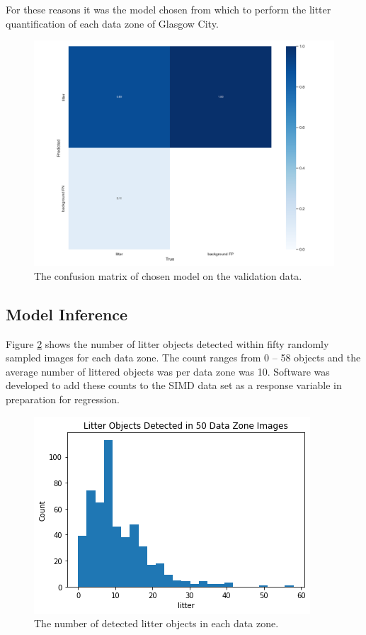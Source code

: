 \documentclass{thesis}
\begin{document}
For these reasons it was the model chosen from which to perform the litter quantification of each data zone of Glasgow City.

\begin{figure}[h]
    \centering
    \includegraphics[scale=0.45]{images/final-model-confusion-matrix-val.png}
    \caption{The confusion matrix of chosen model on the validation data.}
    \label{fig:confusion-matrix-validation}
\end{figure}

\subsection{Model Inference}

Figure \ref{fig:litter-histogram} shows the number of litter objects detected within fifty randomly sampled images for each data zone. The count ranges from 0 -- 58 objects and the average number of littered objects was per data zone was 10. Software was developed to add these counts to the SIMD data set as a response variable in preparation for regression.

\begin{figure}[h!]
    \centering
    \includegraphics[scale=0.75]{images/litter-hist.png}
    \caption{The number of detected litter objects in each data zone.}
    \label{fig:litter-histogram}
\end{figure}
\end{document}
